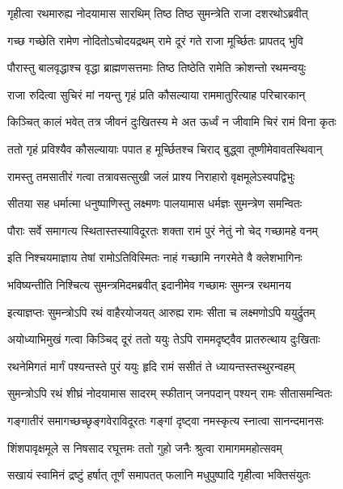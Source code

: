 \twolineshloka
{गृहीत्वा रथमारुह्य नोदयामास सारथिम्}
{तिष्ठ तिष्ठ सुमन्त्रेति राजा दशरथोऽब्रवीत्} %

\twolineshloka
{गच्छ गच्छेति रामेण नोदितोऽचोदयद्रथम्}
{रामे दूरं गते राजा मूर्च्छितः प्रापतद् भुवि} %

\twolineshloka
{पौरास्तु बालवृद्धाश्च वृद्धा ब्राह्मणसत्तमाः}
{तिष्ठ तिष्ठेति रामेति क्रोशन्तो रथमन्वयुः} %

\twolineshloka
{राजा रुदित्वा सुचिरं मां नयन्तु गृहं प्रति}
{कौसल्याया राममातुरित्याह परिचारकान्} %

\twolineshloka
{किञ्चित् कालं भवेत् तत्र जीवनं दुःखितस्य मे}
{अत ऊर्ध्वं न जीवामि चिरं रामं विना कृतः} %

\twolineshloka
{ततो गृहं प्रविश्यैव कौसल्यायाः पपात ह}
{मूर्च्छितश्च चिराद् बुद्ध्वा तूष्णीमेवावतस्थिवान्} %

\twolineshloka
{रामस्तु तमसातीरं गत्वा तत्रावसत्सुखी}
{जलं प्राश्य निराहारो वृक्षमूलेऽस्वपद्विभुः} %

\twolineshloka
{सीतया सह धर्मात्मा धनुष्पाणिस्तु लक्ष्मणः}
{पालयामास धर्मज्ञः सुमन्त्रेण समन्वितः} %

\twolineshloka
{पौराः सर्वे समागत्य स्थितास्तस्याविदूरतः}
{शक्ता रामं पुरं नेतुं नो चेद् गच्छामहे वनम्} %

\twolineshloka
{इति निश्चयमाज्ञाय तेषां रामोऽतिविस्मितः}
{नाहं गच्छामि नगरमेते वै क्लेशभागिनः} %

\twolineshloka
{भविष्यन्तीति निश्चित्य सुमन्त्रमिदमब्रवीत्}
{इदानीमेव गच्छामः सुमन्त्र रथमानय} %

\twolineshloka
{इत्याज्ञप्तः सुमन्त्रोऽपि रथं वाहैरयोजयत्}
{आरुह्य रामः सीता च लक्ष्मणोऽपि ययुर्द्रुतम्} %

\twolineshloka
{अयोध्याभिमुखं गत्वा किञ्चिद् दूरं ततो ययुः}
{तेऽपि राममदृष्ट्वैव प्रातरुत्थाय दुःखिताः} %

\twolineshloka
{रथनेमिगतं मार्गं पश्यन्तस्ते पुरं ययुः}
{हृदि रामं ससीतं ते ध्यायन्तस्तस्थुरन्वहम्} %

\twolineshloka
{सुमन्त्रोऽपि रथं शीघ्रं नोदयामास सादरम्}
{स्फीतान् जनपदान् पश्यन् रामः सीतासमन्वितः} %

\twolineshloka
{गङ्गातीरं समागच्छच्छृङ्गवेराविदूरतः}
{गङ्गां दृष्ट्वा नमस्कृत्य स्नात्वा सानन्दमानसः} %

\twolineshloka
{शिंशपावृक्षमूले स निषसाद रघूत्तमः}
{ततो गुहो जनैः श्रुत्वा रामागममहोत्सवम्} %

\twolineshloka
{सखायं स्वामिनं द्रष्टुं हर्षात् तूर्णं समापतत्}
{फलानि मधुपुष्पादि गृहीत्वा भक्तिसंयुतः} %

